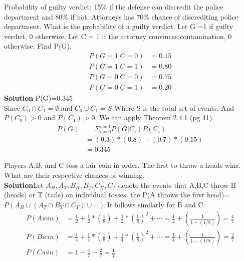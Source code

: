 \documentclass[12pt]{article}
\newenvironment{problem}[2][Problem]{\begin{trivlist}
\item[\hskip \labelsep {\bfseries #1}\hskip \labelsep {\bfseries #2.}]}{\end{trivlist}}
\begin{document}
\begin{problem}{2.4.36} Probability of guilty verdict: 15\% if the defense can discredit the police department and 80\% if not. Attorneys has 70\% chance of discrediting police department. What is the probability of a guilty verdict. Let G =1 if guilty verdict, 0 otherwise. Let C = 1 if the attorney convinces contamination, 0 otherwise: Find P(G).
\begin{align*}
P(G=1 | C=0) &= 0.15 \\
P(G=1 | C =1) &= 0.80 \\
P(G=0 | C=0) &= 0.75 \\
P(G=0 | C=1) &= 0.20 
\end{align*}
\textbf{Solution} P(G)=0.345 \\
Since $C_0 \cap C_1 = \emptyset$ and $C_0 \cup C_1 = S$ Where S is the total set of events. And $P(C_0)>0$ and $P(C_1)>0$. We can apply Theorem 2.4.1 (pg 41). 
\begin{align*}
P(G) &= \Sigma_{i=0}^{i=1}P(G | C_i)P(C_i) \\
 &= (0.3)*(0.8) + (0.7)*(0.15) \\
&= 0.345
\end{align*}
\end{problem}

\begin{problem}{2.5.20} Players A,B, and C toss a fair coin in order. The first to throw a heads wins. What are their respective chances of winning. \\
\textbf{Solution}Let $A_H, A_T, B_H,B_T,C_H,C_T$ denote the events that A,B,C throw H (heads) or T (tails) on individual tosses. the P(A throws the first head)=$P(A_H \cup (A_T \cap B_T \cap C_T)\cup \cdots )$ It follows similarly for B and C. 
\begin{align*}
 P(Awin) &= \frac{1}{2} + \frac{1}{2}*(\frac{1}{8}) + \frac{1}{2}*(\frac{1}{8})^2 + \cdots = \frac{1}{2} +(\frac{1}{1-(1/8)})=\frac{4}{7} \\
 P(Bwin) &= \frac{1}{4} + \frac{1}{4}*(\frac{1}{8}) + \frac{1}{4}*(\frac{1}{8})^2 + \cdots = \frac{1}{4} +(\frac{1}{1-(1/8)})=\frac{2}{7} \\
P(Cwin) &= 1-\frac{4}{7}-\frac{2}{7}=\frac{1}{7}
\end{align*}

\end{problem}
\end{document}

